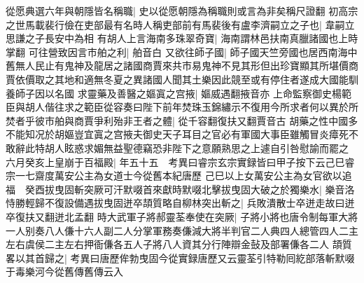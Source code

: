 從愿典選六年與朝隱皆名稱職|{
	史以從愿朝隱為稱職則或言為非矣稱尺證翻}
初高宗之世馬載裴行儉在吏部最有名時人稱吏部前有馬裴後有盧李濟嗣立之子也|{
	韋嗣立思謙之子長安中為相}
有胡人上言海南多珠翠奇寶|{
	海南謂林邑扶南真臘諸國也上時掌翻}
可往營致因言市舶之利|{
	舶音白}
又欲往師子國|{
	師子國天竺旁國也居西南海中舊無人民止有鬼神及龍居之諸國商賈來共市易鬼神不見其形但出珍寶顯其所堪價商賈依價取之其地和適無冬夏之異諸國人聞其土樂因此競至或有停住者遂成大國能馴養師子因以名國}
求靈藥及善醫之嫗寘之宫掖|{
	嫗威遇翻掖音亦}
上命監察御史楊範臣與胡人偕往求之範臣從容奏曰陛下前年焚珠玉錦繡示不復用今所求者何以異於所焚者乎彼市舶與商賈爭利殆非王者之體|{
	從千容翻復扶又翻賈音古}
胡藥之性中國多不能知况於胡嫗豈宜寘之宫掖夫御史天子耳目之官必有軍國大事臣雖觸冒炎瘴死不敢辭此特胡人眩惑求媚無益聖德竊恐非陛下之意願熟思之上遽自引咎慰諭而罷之　六月癸亥上皇崩于百福殿|{
	年五十五　考異曰睿宗玄宗實録皆曰甲子按下云己巳睿宗一七齋度萬安公主為女道士今從舊本紀唐歷}
己巳以上女萬安公主為女官欲以追福　癸酉拔曳固斬突厥可汗默啜首來獻時默啜北擊拔曳固大破之於獨樂水|{
	樂音洛}
恃勝輕歸不復設備遇拔曳固迸卒頡質略自柳林突出斬之|{
	兵敗潰散士卒迸走故曰迸卒復扶又翻迸北孟翻}
時大武軍子將郝靈荃奉使在突厥|{
	子將小將也唐令制每軍大將一人别奏八人傔十六人副二人分掌軍務奏傔減大將半判官二人典四人總管四人二主左右虞侯二主左右押衙傔各五人子將八人資其分行陣辯金鼔及部署傔各二人}
頡質畧以其首歸之|{
	考異曰唐歷侔勃曳固今從實録唐歷又云靈荃引特勒囘紇部落斬默啜于毒樂河今從舊傳舊傳云入}


